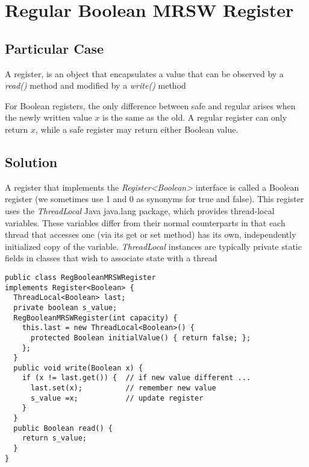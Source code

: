 


\section{\textbf{Regular Boolean MRSW Register}}



\subsection{Particular Case}
\par
A register, is an object that encapsulates a value that can be observed by a \textit{read()} method and modified by a \textit{write()} method
\par
For Boolean registers, the only difference between safe and regular arises when the newly written value $x$ is the same as the old. A regular register can only return $x$, while a safe register may return either Boolean value.
\par



\subsection{Solution}
\par
A register that implements the \textit{Register<Boolean>} interface is called a Boolean register (we sometimes use 1 and 0 as synonyms for true and false).
This register uses the \textit{ThreadLocal} Java java.lang package, which provides thread-local variables. These variables differ from their normal counterparts in that each thread that accesses one (via its get or set method) has its own, independently initialized copy of the variable. \textit{ThreadLocal} instances are typically private static fields in classes that wish to associate state with a thread
\par
\begin{lstlisting}[frame=single,breaklines=true]
public class RegBooleanMRSWRegister 
implements Register<Boolean> {
  ThreadLocal<Boolean> last;
  private boolean s_value;
  RegBooleanMRSWRegister(int capacity) {
    this.last = new ThreadLocal<Boolean>() {
      protected Boolean initialValue() { return false; };
    };
  }
  public void write(Boolean x) {
    if (x != last.get()) {  // if new value different ...
      last.set(x);          // remember new value
      s_value =x;           // update register
    }
  }
  public Boolean read() {
    return s_value;
  }
}
\end{lstlisting}

